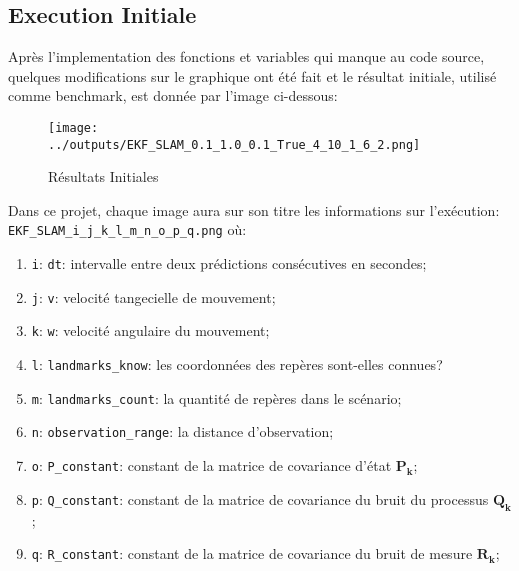 \documentclass[../CSC_5RO12_TA_TP4.tex]{subfiles}
\begin{document}
\newpage
\subsection{Execution Initiale}
\noindent Après l'implementation des fonctions et variables qui manque au code source, quelques modifications sur le graphique ont été fait et le résultat initiale, utilisé comme benchmark, est donnée par l'image ci-dessous:
\begin{figure}[H]
    \centering
	\texttt{[image: ../outputs/EKF\_SLAM\_0.1\_1.0\_0.1\_True\_4\_10\_1\_6\_2.png]}
	\caption{Résultats Initiales}
	\label{}
\end{figure}
\begin{remark}
    Dans ce projet, chaque image aura sur son titre les informations sur l'exécution: \texttt{EKF\_SLAM\_i\_j\_k\_l\_m\_n\_o\_p\_q.png} où:
    \begin{enumerate}[noitemsep]
        \item \texttt{i}: \texttt{dt}: intervalle entre deux prédictions consécutives en secondes;
        \item \texttt{j}: \texttt{v}: velocité tangecielle de mouvement;
        \item \texttt{k}: \texttt{w}: velocité angulaire du mouvement;
        \item \texttt{l}: \texttt{landmarks\_know}: les coordonnées des repères sont-elles connues?
        \item \texttt{m}: \texttt{landmarks\_count}: la quantité de repères dans le scénario;
        \item \texttt{n}: \texttt{observation\_range}: la distance d'observation;
        \item \texttt{o}: \texttt{P\_constant}: constant de la matrice de covariance d'état $\mathbf{P_{k}}$;
        \item \texttt{p}: \texttt{Q\_constant}: constant de la matrice de covariance du bruit du processus $\mathbf{Q_{k}}$;
        \item \texttt{q}: \texttt{R\_constant}: constant de la matrice de covariance du bruit de mesure $\mathbf{R_{k}}$;
    \end{enumerate}
\end{remark}
\end{document}
